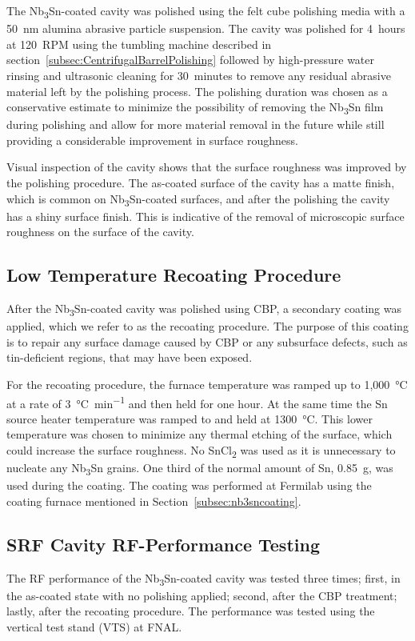 The Nb\textsubscript{3}Sn-coated cavity was polished using the felt cube polishing media with a 50~nm alumina abrasive particle suspension. The cavity was polished for 4~hours at 120~RPM using the tumbling machine described in section~\ref{subsec:CentrifugalBarrelPolishing} followed by high-pressure water rinsing and ultrasonic cleaning for 30~minutes to remove any residual abrasive material left by the polishing process. The polishing duration was chosen as a conservative estimate to minimize the possibility of removing the Nb\textsubscript{3}Sn film during polishing and allow for more material removal in the future while still providing a considerable improvement in surface roughness.

Visual inspection of the cavity shows that the surface roughness was improved by the polishing procedure. The as-coated surface of the cavity has a matte finish, which is common on Nb\textsubscript{3}Sn-coated surfaces, and after the polishing the cavity has a shiny surface finish. This is indicative of the removal of microscopic surface roughness on the surface of the cavity.
%
\subsection{Low Temperature Recoating Procedure}%
\label{subsec:recoating}%
After the Nb\textsubscript{3}Sn-coated cavity was polished using CBP, a secondary coating was applied, which we refer to as the recoating procedure. The purpose of this coating is to repair any surface damage caused by CBP or any subsurface defects, such as tin-deficient regions, that may have been exposed.

For the recoating procedure, the furnace temperature was ramped up to 1,000~°C at a rate of 3~\unit{\celsius\per\minute} and then held for one hour. At the same time the Sn source heater temperature was ramped to and held at 1300~°C.
This lower temperature was chosen to minimize any thermal etching of the surface, which could increase the surface roughness. No SnCl\textsubscript{2} was used as it is unnecessary to nucleate any Nb\textsubscript{3}Sn grains. One third of the normal amount of Sn, 0.85~g, was used during the coating. The coating was performed at Fermilab using the coating furnace mentioned in Section~\ref{subsec:nb3sncoating}.

%
\subsection{SRF Cavity RF-Performance Testing}%
\label{subsec:vts}%
The RF performance of the Nb\textsubscript{3}Sn-coated cavity was tested three times; first, in the as-coated state with no polishing applied; second, after the CBP treatment; lastly, after the recoating procedure. The performance was tested using the vertical test stand (VTS) at FNAL\cite{pischalnikov2014rf}.

